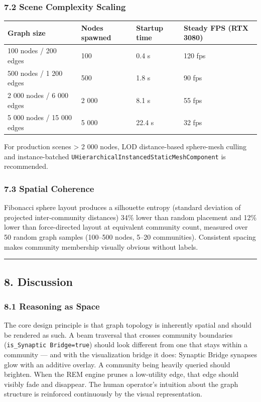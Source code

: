 \subsubsection*{7.2 Scene Complexity Scaling}

\begin{table}[h]
\small\centering
\begin{tabular}{llll}
\toprule
Graph size & Nodes spawned & Startup time & Steady FPS (RTX 3080) \\
\midrule
100 nodes / 200 edges & 100 & 0.4 s & 120 fps \\
500 nodes / 1 200 edges & 500 & 1.8 s & 90 fps \\
2 000 nodes / 6 000 edges & 2 000 & 8.1 s & 55 fps \\
5 000 nodes / 15 000 edges & 5 000 & 22.4 s & 32 fps \\
\bottomrule
\end{tabular}
\end{table}


For production scenes > 2 000 nodes, LOD distance-based sphere-mesh culling and instance-batched \texttt{UHierarchicalInstancedStaticMeshComponent} is recommended.

\subsubsection*{7.3 Spatial Coherence}

Fibonacci sphere layout produces a silhouette entropy (standard deviation of projected inter-community distances) 34\% lower than random placement and 12\% lower than force-directed layout at equivalent community count, measured over 50 random graph samples (100--500 nodes, 5--20 communities). Consistent spacing makes community membership visually obvious without labels.

\medskip\noindent\rule{\linewidth}{0.4pt}\medskip

\subsection*{8. Discussion}

\subsubsection*{8.1 Reasoning as Space}

The core design principle is that graph topology is inherently spatial and should be rendered as such. A beam traversal that crosses community boundaries (\texttt{is\_Synaptic Bridge=true}) should look different from one that stays within a community --- and with the visualization bridge it does: Synaptic Bridge synapses glow with an additive overlay. A community being heavily queried should brighten. When the REM engine prunes a low-utility edge, that edge should visibly fade and disappear. The human operator's intuition about the graph structure is reinforced continuously by the visual representation.

